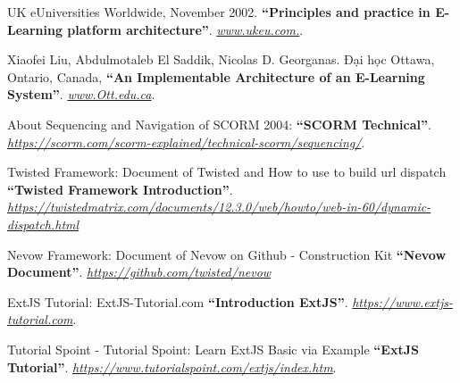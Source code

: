 \newpage

	\begin{thebibliography}{9}
	
\bibitem{}
UK eUniversities Worldwide, November 2002. 
\textbf{“Principles and practice in E-Learning platform architecture”}.
\textit{\href{www.ukeu.com.}{www.ukeu.com.}}.

\bibitem{}
Xiaofei Liu, Abdulmotaleb El Saddik, Nicolas D. Georganas. Đại học Ottawa, Ontario, Canada,
\textbf{“An Implementable Architecture of an E-Learning System”}.
\textit{\href{www.Ott.edu.ca}{www.Ott.edu.ca}}.

\bibitem{}
About Sequencing and Navigation of SCORM 2004: \textbf{“SCORM Technical”}. \textit{\href{https://scorm.com/scorm-explained/technical-scorm/sequencing/}{https://scorm.com/scorm-explained/technical-scorm/sequencing/}}.

\bibitem{}
Twisted Framework: Document of Twisted and How to use to build url dispatch
\textbf{“Twisted Framework Introduction”}.
\textit{\href{https://twistedmatrix.com/documents/12.3.0/web/howto/web-in-60/dynamic-dispatch.html}{https://twistedmatrix.com/documents/12.3.0/web/howto/web-in-60/dynamic-dispatch.html}}	

\bibitem{}
Nevow Framework: Document of Nevow on Github - Construction Kit
\textbf{“Nevow Document”}.
\textit{\href{https://github.com/twisted/nevow}{https://github.com/twisted/nevow}}	

\bibitem{}
ExtJS Tutorial: ExtJS-Tutorial.com
\textbf{“Introduction ExtJS”}.
\textit{\href{https://www.extjs-tutorial.com}{https://www.extjs-tutorial.com}}.

\bibitem{}
Tutorial Spoint - Tutorial Spoint: Learn ExtJS Basic via Example
\textbf{“ExtJS Tutorial”}.
\textit{\href{https://www.tutorialspoint.com/extjs/index.htm}{https://www.tutorialspoint.com/extjs/index.htm}}.
	

\end{thebibliography}

